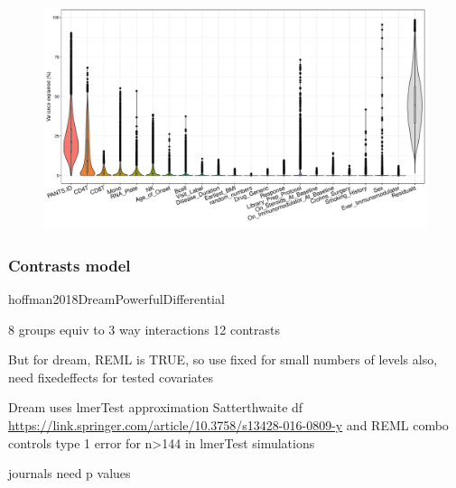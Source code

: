 \begin{outline}

\begin{figure}
    \centering
    \includegraphics[width=1.0\textwidth,page=1]{mainmatter/figures/chapter_05/dream.plotVarPart.pdf}
    \caption{}
    \label{fig:multipants_varPart}
\end{figure}

\subsubsection{Contrasts model}

 hoffman2018DreamPowerfulDifferential

8 groups equiv to 3 way interactions
12 contrasts

But for dream, 
REML is TRUE, so use fixed for small numbers of levels
also, need fixedeffects for tested covariates

Dream uses lmerTest approximation Satterthwaite df \url{https://link.springer.com/article/10.3758/s13428-016-0809-y} and REML
combo controls type 1 error for n>144 in lmerTest simulations

journals need p values
%


\end{outline}
